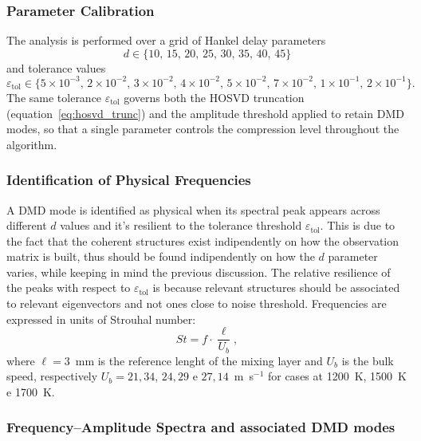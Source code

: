 \subsubsection{Parameter Calibration}
\label{sec:coria_params}

The analysis is performed over a grid of Hankel delay parameters
\begin{equation}
    d \in \{10,\, 15,\, 20,\, 25,\, 30,\, 35,\, 40,\, 45\}
    \label{eq:d_values}
\end{equation}
and tolerance values
\begin{equation}
    \varepsilon_{\mathrm{tol}} \in
    \{5\times10^{-3},\, 2\times10^{-2},\, 3\times10^{-2},\, 4\times10^{-2},\,
      5\times10^{-2},\, 7\times10^{-2},\, 1\times10^{-1},\, 2\times10^{-1}\}.
    \label{eq:tol_values}
\end{equation}
The same tolerance $\varepsilon_{\mathrm{tol}}$ governs both the HOSVD truncation (equation~\eqref{eq:hosvd_trunc}) and the amplitude threshold applied to retain DMD modes, so that a single parameter controls the compression level throughout the algorithm.

\subsubsection{Identification of Physical Frequencies}
\label{sec:coria_frequencies}
A DMD mode is identified as physical when its spectral peak appears across different $d$ values and it's resilient to the tolerance threshold $\varepsilon_{\mathrm{tol}}$. This is due to the fact that the coherent structures exist indipendently on how the observation matrix is built, thus should be found indipendently on how the $d$ parameter varies, while keeping in mind the previous discussion. The relative resilience of the peaks with respect to $\varepsilon_{\mathrm{tol}}$ is because relevant structures should be associated to relevant eigenvectors and not ones close to noise threshold. Frequencies are expressed in units of Strouhal number: 
\begin{equation}
    St = f \cdot \frac{\ell}{U_b},
\label{eq:strouhal}
\end{equation}
where $\ell = 3$~mm is the reference lenght of the mixing layer and  $U_b$ is the bulk speed, respectively $U_b = 21{,}34$, $24{,}29$ e $27{,}14$~m~s$^{-1}$ for cases at 1200~K, 1500~K e 1700~K.


\subsubsection{Frequency--Amplitude Spectra and associated DMD modes}
\label{sec:freq_amplitude}

